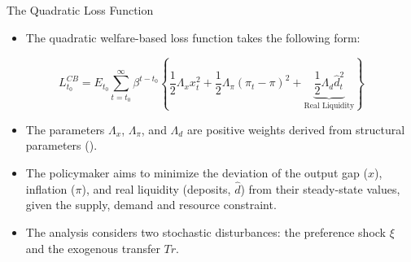 \documentclass[11pt,aspectratio=169]{beamer}
\begin{document}
\begin{frame}{The Quadratic Loss Function}
\small
\begin{itemize}
    \item The quadratic welfare-based loss function takes the following form:
\end{itemize}

\footnotesize
\begin{equation}
    L_{t_{0}}^{CB}=E_{t_{0}}\sum_{t=t_{0}}^{\infty }\beta ^{t-t_{0}}\left\{ \frac{1}{2}\Lambda _{x}x_{t}^{2} + \frac{1}{2}\Lambda _{\pi }(\pi _{t}-\pi )^{2} +\underbrace{\frac{1}{2}\Lambda _{d}\hat{d}_{t}^{2}}_{\text{Real Liquidity}} \right\} \label{Loss-Text}
\end{equation}
\vspace{0.2cm}
\small
\begin{itemize}
    \item The parameters $\Lambda _{x}$, $\Lambda _{\pi }$, and $\Lambda _{d}$ are positive weights derived from structural parameters (\cite{benigno2022}).
    \item The policymaker aims to minimize the deviation of the output gap ($x$), inflation ($\pi$), and real liquidity (deposits, $\hat{d}$) from their steady-state values, given the supply, demand and resource constraint.
    \item The analysis considers two stochastic disturbances: the preference shock $\xi$ and the exogenous transfer $Tr$.
\end{itemize}
\end{frame}
\end{document}
